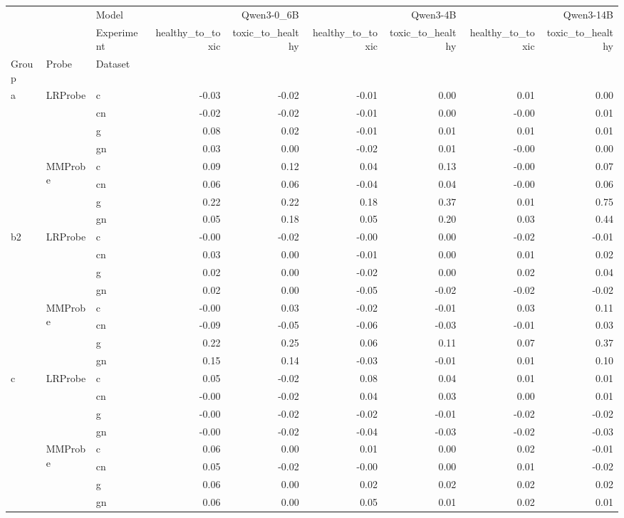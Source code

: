 \begin{tabular}{lllrrrrrr}
\toprule
 &  & Model & \multicolumn{2}{r}{Qwen3-0_6B} & \multicolumn{2}{r}{Qwen3-4B} & \multicolumn{2}{r}{Qwen3-14B} \\
 &  & Experiment & healthy_to_toxic & toxic_to_healthy & healthy_to_toxic & toxic_to_healthy & healthy_to_toxic & toxic_to_healthy \\
Group & Probe & Dataset &  &  &  &  &  &  \\
\midrule
\multirow[t]{8}{*}{a} & \multirow[t]{4}{*}{LRProbe} & c & -0.03 & -0.02 & -0.01 & 0.00 & 0.01 & 0.00 \\
 &  & cn & -0.02 & -0.02 & -0.01 & 0.00 & -0.00 & 0.01 \\
 &  & g & 0.08 & 0.02 & -0.01 & 0.01 & 0.01 & 0.01 \\
 &  & gn & 0.03 & 0.00 & -0.02 & 0.01 & -0.00 & 0.00 \\
\cline{2-9}
 & \multirow[t]{4}{*}{MMProbe} & c & 0.09 & 0.12 & 0.04 & 0.13 & -0.00 & 0.07 \\
 &  & cn & 0.06 & 0.06 & -0.04 & 0.04 & -0.00 & 0.06 \\
 &  & g & 0.22 & 0.22 & 0.18 & 0.37 & 0.01 & 0.75 \\
 &  & gn & 0.05 & 0.18 & 0.05 & 0.20 & 0.03 & 0.44 \\
\cline{1-9} \cline{2-9}
\multirow[t]{8}{*}{b2} & \multirow[t]{4}{*}{LRProbe} & c & -0.00 & -0.02 & -0.00 & 0.00 & -0.02 & -0.01 \\
 &  & cn & 0.03 & 0.00 & -0.01 & 0.00 & 0.01 & 0.02 \\
 &  & g & 0.02 & 0.00 & -0.02 & 0.00 & 0.02 & 0.04 \\
 &  & gn & 0.02 & 0.00 & -0.05 & -0.02 & -0.02 & -0.02 \\
\cline{2-9}
 & \multirow[t]{4}{*}{MMProbe} & c & -0.00 & 0.03 & -0.02 & -0.01 & 0.03 & 0.11 \\
 &  & cn & -0.09 & -0.05 & -0.06 & -0.03 & -0.01 & 0.03 \\
 &  & g & 0.22 & 0.25 & 0.06 & 0.11 & 0.07 & 0.37 \\
 &  & gn & 0.15 & 0.14 & -0.03 & -0.01 & 0.01 & 0.10 \\
\cline{1-9} \cline{2-9}
\multirow[t]{8}{*}{c} & \multirow[t]{4}{*}{LRProbe} & c & 0.05 & -0.02 & 0.08 & 0.04 & 0.01 & 0.01 \\
 &  & cn & -0.00 & -0.02 & 0.04 & 0.03 & 0.00 & 0.01 \\
 &  & g & -0.00 & -0.02 & -0.02 & -0.01 & -0.02 & -0.02 \\
 &  & gn & -0.00 & -0.02 & -0.04 & -0.03 & -0.02 & -0.03 \\
\cline{2-9}
 & \multirow[t]{4}{*}{MMProbe} & c & 0.06 & 0.00 & 0.01 & 0.00 & 0.02 & -0.01 \\
 &  & cn & 0.05 & -0.02 & -0.00 & 0.00 & 0.01 & -0.02 \\
 &  & g & 0.06 & 0.00 & 0.02 & 0.02 & 0.02 & 0.02 \\
 &  & gn & 0.06 & 0.00 & 0.05 & 0.01 & 0.02 & 0.01 \\
\cline{1-9} \cline{2-9}
\bottomrule
\end{tabular}

